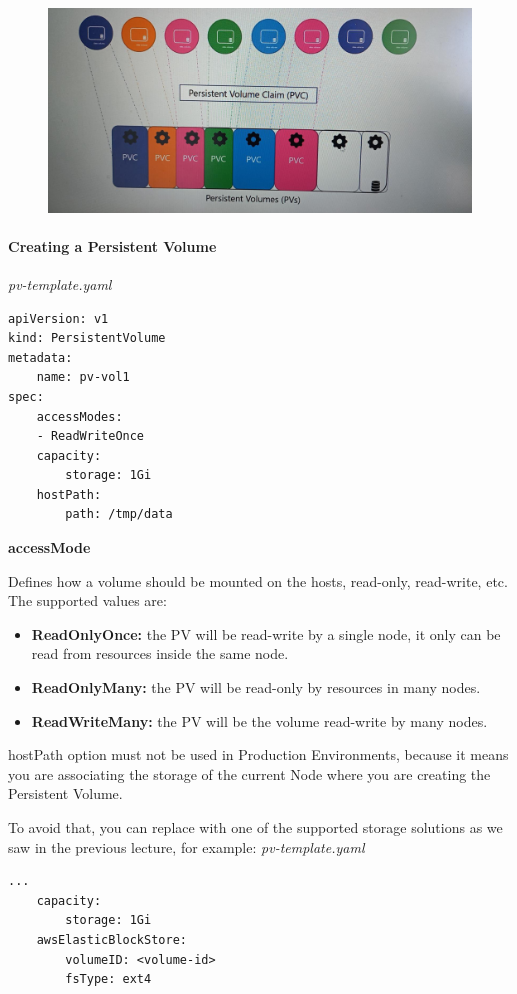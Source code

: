 \documentclass{article}
\newenvironment{blocktemplateIII}[1]{%
    \tcolorbox[beamer,%
    noparskip,breakable,
    ,colframe=Red,%
    colbacklower=LimeGreen!75!LightGreen,%
    title=#1]}%
    {\endtcolorbox}
\newenvironment{codetemplate}[1][]{%
  \mybasecolorbox[#1]
  \itshape
}{%
  \endmybasecolorbox
}
\begin{document}
\begin{figure}[H]
    \includegraphics[width=\textwidth]{pictures/pv.png}
\end{figure}

\paragraph{Creating a Persistent Volume}

\begin{codetemplate}{pv-template.yaml}
\begin{verbatim}
apiVersion: v1
kind: PersistentVolume
metadata:
    name: pv-vol1
spec:
    accessModes:
    - ReadWriteOnce
    capacity:
        storage: 1Gi
    hostPath:
        path: /tmp/data
\end{verbatim}
\end{codetemplate}

\textbf{accessMode}

Defines how a volume should be mounted on the hosts, read-only, read-write, etc. The supported values are:
\begin{itemize}
    \item \textbf{ReadOnlyOnce:} the PV will be read-write by a single node, it only can be read from resources inside the same node.
    \item \textbf{ReadOnlyMany:} the PV will be read-only by resources in many nodes.
    \item \textbf{ReadWriteMany:} the PV will be the volume read-write by many nodes.
\end{itemize}

\begin{blocktemplateIII}{WARNING}
hostPath option must not be used in Production Environments, because it means you are associating the storage of the current Node where you are creating the Persistent Volume.

To avoid that, you can replace with one of the supported storage solutions as we saw in the previous lecture, for example:
\begin{codetemplate}{pv-template.yaml}
\begin{verbatim}
...
    capacity:
        storage: 1Gi
    awsElasticBlockStore:
        volumeID: <volume-id>
        fsType: ext4
\end{verbatim}
\end{codetemplate}

\end{blocktemplateIII}
\end{document}
